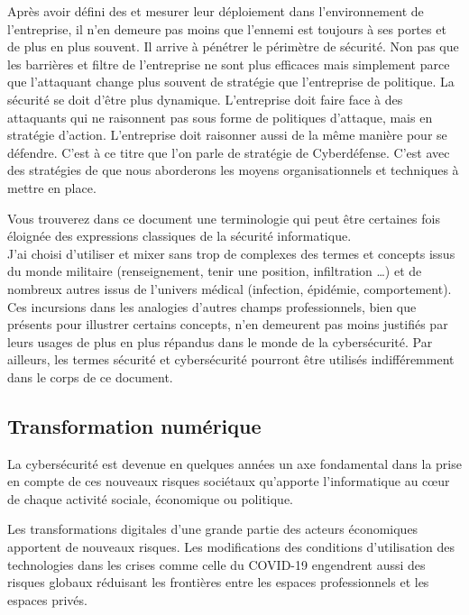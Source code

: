 Après avoir défini des  et mesurer leur déploiement dans l’environnement de l’entreprise, il n’en demeure pas moins que l’ennemi est toujours à ses portes et de plus en plus souvent. Il arrive à pénétrer le périmètre de sécurité.
Non pas que les barrières et filtre de l'entreprise ne sont plus efficaces mais simplement parce que l'attaquant change plus souvent de stratégie que l'entreprise de politique. La sécurité se doit d'être plus dynamique.
L’entreprise doit faire face à des attaquants qui ne raisonnent pas sous forme de politiques d’attaque, mais en stratégie d'action. L’entreprise doit raisonner aussi de la même manière pour se défendre. C'est à ce titre que l'on parle de stratégie de Cyberdéfense.
C'est avec des stratégies de  que nous aborderons les moyens organisationnels et techniques à mettre en place.

Vous trouverez  dans ce document une terminologie qui peut être certaines fois éloignée des expressions classiques de la sécurité informatique. \\
J'ai choisi d'utiliser et mixer sans trop de complexes des termes et concepts issus du monde militaire (renseignement, tenir une position, infiltration …) et de nombreux autres issus de l'univers médical (infection, épidémie, comportement).\\ Ces incursions dans les analogies d'autres champs professionnels, bien que présents pour illustrer certains concepts, n'en demeurent pas moins justifiés par leurs usages de plus en plus répandus dans le monde de la cybersécurité. Par ailleurs, les termes sécurité et cybersécurité pourront être utilisés indifféremment dans le corps de ce document.

\subsection {Transformation numérique}


La cybersécurité est devenue en quelques années un axe fondamental dans la prise en compte de ces nouveaux risques sociétaux qu'apporte l'informatique au cœur de chaque activité sociale, économique ou politique.

Les  transformations digitales d'une grande partie des acteurs économiques apportent de nouveaux risques. Les modifications des conditions d'utilisation des technologies dans les crises comme celle du COVID-19 engendrent aussi des risques globaux réduisant les frontières entre les espaces professionnels et les espaces privés.

